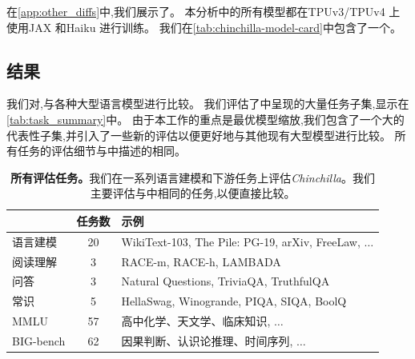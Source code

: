\documentclass[11pt, a4paper, logo, copyright, nonumbering]{deepmind}
\newcommand{\gopher}{\textit{Gopher}\xspace}
\newcommand{\chinchilla}{\textit{Chinchilla}\xspace}
\newcommand{\bigbench}{BIG-bench\xspace}
\begin{document}
在\autoref{app:other_diffs}中,我们展示了。
本分析中的所有模型都在TPUv3/TPUv4 \citep{10.1145/3079856.3080246}上使用JAX \citep{jax2018github}和Haiku \citep{haiku2020github}进行训练。
我们在\autoref{tab:chinchilla-model-card}中包含了一个 \citep{mitchell2019model}。

\subsection{结果}
\label{sec:model_analysis}
我们对,与各种大型语言模型进行比较。
我们评估了\citet{rae2021gopher}中呈现的大量任务子集,显示在\autoref{tab:task_summary}中。
由于本工作的重点是最优模型缩放,我们包含了一个大的代表性子集,并引入了一些新的评估以便更好地与其他现有大型模型进行比较。
所有任务的评估细节与\citet{rae2021gopher}中描述的相同。

\begin{table}
    \centering
    \begin{tabular}{l c l}
    \toprule
        & 任务数 & 示例 \\
    \midrule
    语言建模 & 20  & {\small WikiText-103, The Pile: PG-19, arXiv, FreeLaw, $\ldots$} \\ 
    阅读理解 & 3 & {\small RACE-m, RACE-h, LAMBADA} \\
    问答 & 3 & {\small Natural Questions, TriviaQA, TruthfulQA} \\
    常识 & 5 & {\small HellaSwag, Winogrande, PIQA, SIQA, BoolQ} \\
    MMLU & 57 & {\small 高中化学、天文学、临床知识, $\ldots$} \\
    \bigbench & 62 & {\small 因果判断、认识论推理、时间序列, $\ldots$}  \\
    \bottomrule
    \end{tabular}
    \caption{\textbf{所有评估任务。}我们在一系列语言建模和下游任务上评估\chinchilla。我们主要评估与\citet{rae2021gopher}中相同的任务,以便直接比较。}
    \label{tab:task_summary}
\end{table}
\end{document}
